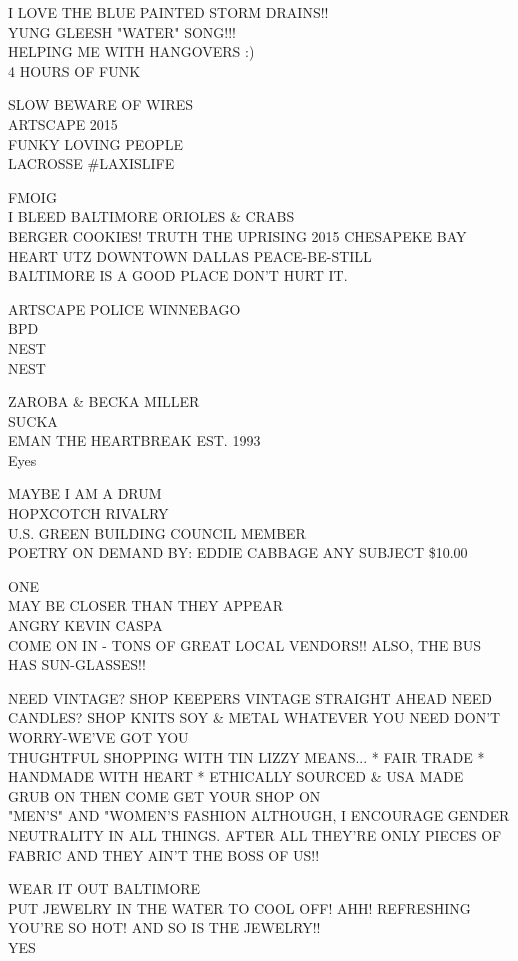 \documentclass[10pt,letterpaper]{article}
\begin{document}
I LOVE THE BLUE PAINTED STORM DRAINS!!\\
YUNG GLEESH "WATER" SONG!!!\\
HELPING ME WITH HANGOVERS :)\\
4 HOURS OF FUNK

SLOW BEWARE OF WIRES\\
ARTSCAPE 2015\\
FUNKY LOVING PEOPLE\\
LACROSSE \#LAXISLIFE

FMOIG\\
I BLEED BALTIMORE ORIOLES \& CRABS\\
BERGER COOKIES!  TRUTH THE UPRISING 2015 CHESAPEKE BAY HEART UTZ DOWNTOWN DALLAS PEACE{-}BE{-}STILL\\
BALTIMORE IS A GOOD PLACE DON'T HURT IT.

ARTSCAPE POLICE WINNEBAGO\\
BPD\\
NEST\\
NEST

ZAROBA \& BECKA MILLER\\
SUCKA\\
EMAN THE HEARTBREAK EST. 1993\\
Eyes

MAYBE I AM A DRUM\\
HOPXCOTCH RIVALRY\\
U.S. GREEN BUILDING COUNCIL MEMBER\\
POETRY ON DEMAND BY: EDDIE CABBAGE ANY SUBJECT \$10.00

ONE\\
MAY BE CLOSER THAN THEY APPEAR\\
ANGRY KEVIN CASPA\\
COME ON IN {-} TONS OF GREAT LOCAL VENDORS!! ALSO, THE BUS HAS SUN{-}GLASSES!!

NEED VINTAGE?  SHOP KEEPERS VINTAGE STRAIGHT AHEAD NEED CANDLES? SHOP KNITS SOY \& METAL WHATEVER YOU NEED DON'T WORRY{-}WE'VE GOT YOU\\
THUGHTFUL SHOPPING WITH TIN LIZZY MEANS... * FAIR TRADE * HANDMADE WITH HEART * ETHICALLY SOURCED \& USA MADE\\
GRUB ON THEN COME GET YOUR SHOP ON\\
"MEN'S" AND "WOMEN'S  FASHION ALTHOUGH, I ENCOURAGE GENDER NEUTRALITY IN ALL THINGS.  AFTER ALL THEY'RE ONLY PIECES OF FABRIC AND THEY AIN'T THE BOSS OF US!!

WEAR IT OUT BALTIMORE\\
PUT JEWELRY IN THE WATER TO COOL OFF!  AHH!  REFRESHING\\
YOU'RE SO HOT!  AND SO IS THE JEWELRY!!\\
YES
\end{document}

